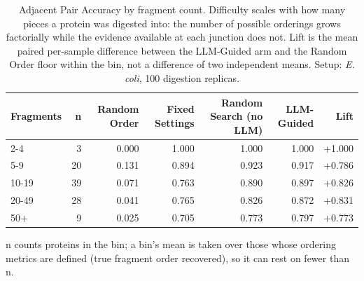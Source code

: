 \begin{table}[!tb]
  \centering
  \caption{Adjacent Pair Accuracy by fragment count. Difficulty scales with how many pieces a protein was digested into: the number of possible orderings grows factorially while the evidence available at each junction does not. Lift is the mean paired per-sample difference between the LLM-Guided arm and the Random Order floor within the bin, not a difference of two independent means. Setup: \textnormal{\textnormal{\textit{E. coli}}}, 100 digestion replicas.}
  \label{tab:stratification_ecoli_r100}
  \begin{tabular}{lrrrrrr}
    \toprule
    Fragments & n & Random Order & Fixed Settings & Random Search (no LLM) & LLM-Guided & Lift \\
    \midrule
    2-4 & 3 & 0.000 & 1.000 & 1.000 & 1.000 & +1.000 \\
    5-9 & 20 & 0.131 & 0.894 & 0.923 & 0.917 & +0.786 \\
    10-19 & 39 & 0.071 & 0.763 & 0.890 & 0.897 & +0.826 \\
    20-49 & 28 & 0.041 & 0.765 & 0.826 & 0.872 & +0.831 \\
    50+ & 9 & 0.025 & 0.705 & 0.773 & 0.797 & +0.773 \\
    \bottomrule
  \end{tabular}
  \par\smallskip\footnotesize{n counts proteins in the bin; a bin's mean is taken over those whose ordering metrics are defined (true fragment order recovered), so it can rest on fewer than n.}
\end{table}
